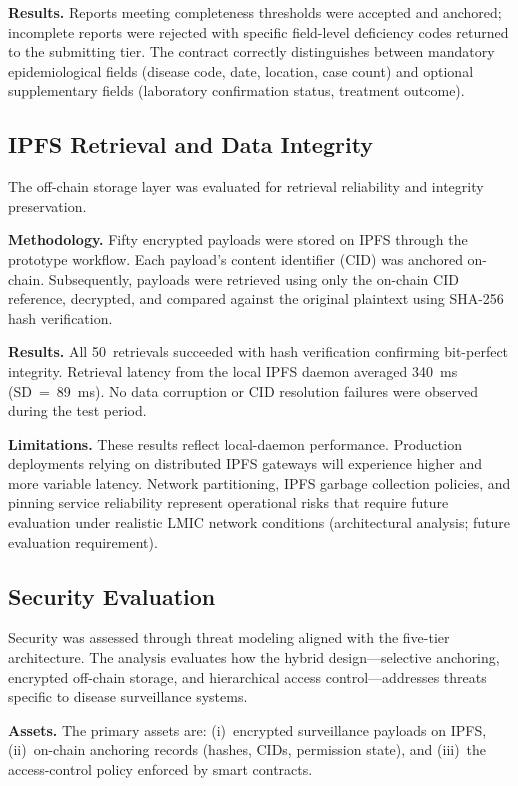 \documentclass[AMA,LATO1COL]{WileyNJD-v2}
\begin{document}
\textbf{Results.} Reports meeting completeness thresholds were accepted and anchored; incomplete reports were rejected with specific field-level deficiency codes returned to the submitting tier. The contract correctly distinguishes between mandatory epidemiological fields (disease code, date, location, case count) and optional supplementary fields (laboratory confirmation status, treatment outcome).

\subsection{IPFS Retrieval and Data Integrity}\label{subsec:ipfs_eval}

The off-chain storage layer was evaluated for retrieval reliability and integrity preservation.

\textbf{Methodology.} Fifty encrypted payloads were stored on IPFS through the prototype workflow. Each payload's content identifier (CID) was anchored on-chain. Subsequently, payloads were retrieved using only the on-chain CID reference, decrypted, and compared against the original plaintext using SHA-256 hash verification.

\textbf{Results.} All 50~retrievals succeeded with hash verification confirming bit-perfect integrity. Retrieval latency from the local IPFS daemon averaged 340~ms (SD~=~89~ms). No data corruption or CID resolution failures were observed during the test period.

\textbf{Limitations.} These results reflect local-daemon performance. Production deployments relying on distributed IPFS gateways will experience higher and more variable latency. Network partitioning, IPFS garbage collection policies, and pinning service reliability represent operational risks that require future evaluation under realistic LMIC network conditions (architectural analysis; future evaluation requirement).

\subsection{Security Evaluation}\label{subsec:security}

Security was assessed through threat modeling aligned with the five-tier architecture. The analysis evaluates how the hybrid design---selective anchoring, encrypted off-chain storage, and hierarchical access control---addresses threats specific to disease surveillance systems.

\textbf{Assets.} The primary assets are: (i)~encrypted surveillance payloads on IPFS, (ii)~on-chain anchoring records (hashes, CIDs, permission state), and (iii)~the access-control policy enforced by smart contracts.
\end{document}

